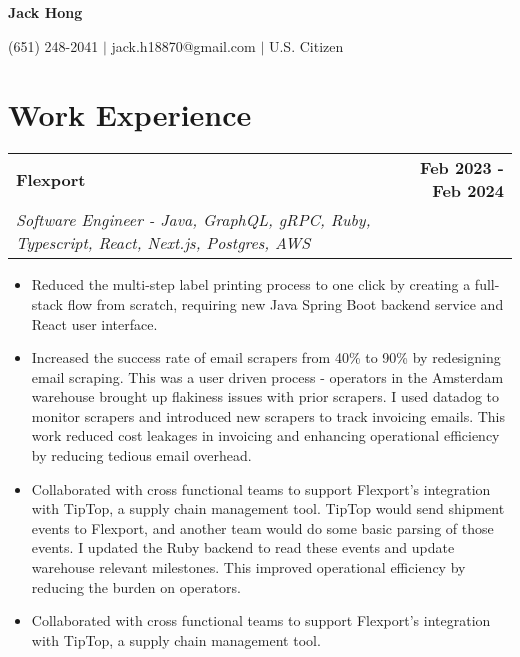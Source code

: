\documentclass[10pt]{extreport}
\makeatletter
\newcommand{\resumeSubheading}[4]{
  \vspace{-1pt}
    \begin{tabular*}{1.0\textwidth}{l@{\extracolsep{\fill}}r}
      \textbf{#1} & \textbf{#2}  \vspace{1mm} \\
      {#3} & \textbf{#4} \\
    \end{tabular*}\vspace{-3pt}
}
\makeatother
\begin{document}
\vspace*{-40pt}
\begin{center}
	\textbf{{\LARGE Jack Hong}} \\
	      \vspace{2mm}

    (651) 248-2041 $|$ jack.h18870@gmail.com $|$ U.S. Citizen
\end{center}
\vspace{-4mm}

\section{Work Experience}
\resumeSubheading{Flexport}{Feb 2023 - Feb 2024}
    {\textit{Software Engineer - Java, GraphQL, gRPC, Ruby, Typescript, React, Next.js, Postgres, AWS}}{}
    \vspace{-2mm}
    \begin{itemize}
    \item[\textperiodcentered] Reduced the multi-step label printing process to one click by creating a full-stack flow from scratch, requiring new Java Spring Boot backend service and React user interface.
        \vspace{-2mm}

    \item[\textperiodcentered] Increased the success rate of email scrapers from 40\% to 90\% by redesigning email scraping. This was a user driven process - operators in the Amsterdam warehouse brought up flakiness issues with prior scrapers. I used datadog to monitor scrapers and introduced new scrapers to track invoicing emails. This work reduced cost leakages in invoicing and enhancing operational efficiency by reducing tedious email overhead.
            \vspace{-2mm}

   \item[\textperiodcentered] Collaborated with cross functional teams to support Flexport’s integration with TipTop, a supply chain management tool. TipTop would send shipment events to Flexport, and another team would do some basic parsing of those events. I updated the Ruby backend to read these events and update warehouse relevant milestones. This improved operational efficiency by reducing the burden on operators.
           \vspace{-2mm}

   \item[\textperiodcentered] Collaborated with cross functional teams to support Flexport's integration with TipTop, a supply chain management tool. 
    \end{itemize}
\end{document}
